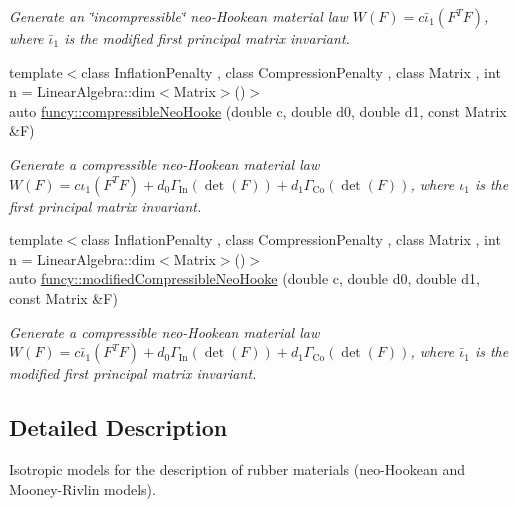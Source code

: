 \begin{DoxyCompactItemize}
\begin{DoxyCompactList}\small\item\em Generate an \char`\"{}incompressible\char`\"{} neo-\/\-Hookean material law $ W(F)=c\bar\iota_1(F^T F) $, where $\bar\iota_1$ is the modified first principal matrix invariant. \end{DoxyCompactList}\item 
{\footnotesize template$<$class Inflation\-Penalty , class Compression\-Penalty , class Matrix , int n = Linear\-Algebra\-::dim$<$\-Matrix$>$()$>$ }\\auto \hyperlink{group__Rubber_ga03b9323b57ee11b09ed0515d6ea5b01b}{funcy\-::compressible\-Neo\-Hooke} (double c, double d0, double d1, const Matrix \&F)
\begin{DoxyCompactList}\small\item\em Generate a compressible neo-\/\-Hookean material law $ W(F)=c\iota_1(F^T F)+d_0\Gamma_\mathrm{In}(\det(F))+d_1\Gamma_\mathrm{Co}(\det(F)) $, where $\iota_1$ is the first principal matrix invariant. \end{DoxyCompactList}\item 
{\footnotesize template$<$class Inflation\-Penalty , class Compression\-Penalty , class Matrix , int n = Linear\-Algebra\-::dim$<$\-Matrix$>$()$>$ }\\auto \hyperlink{group__Rubber_ga77093789a2488adcffd7d3f97b8a75e4}{funcy\-::modified\-Compressible\-Neo\-Hooke} (double c, double d0, double d1, const Matrix \&F)
\begin{DoxyCompactList}\small\item\em Generate a compressible neo-\/\-Hookean material law $ W(F)=c\bar\iota_1(F^T F)+d_0\Gamma_\mathrm{In}(\det(F))+d_1\Gamma_\mathrm{Co}(\det(F)) $, where $\bar\iota_1$ is the modified first principal matrix invariant. \end{DoxyCompactList}\end{DoxyCompactItemize}


\subsection{Detailed Description}
Isotropic models for the description of rubber materials (neo-\/\-Hookean and Mooney-\/\-Rivlin models). 

